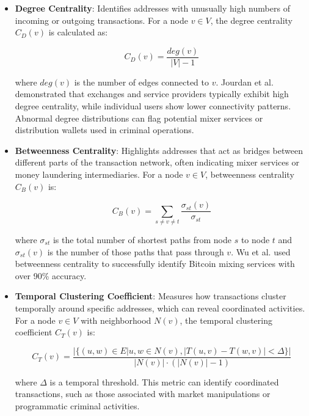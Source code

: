 \documentclass[conference]{IEEEtran}
\begin{document}
\begin{itemize}
    \item \textbf{Degree Centrality}: Identifies addresses with unusually high numbers of incoming or outgoing transactions. For a node $v \in V$, the degree centrality $C_D(v)$ is calculated as:
    
    \begin{equation}
    C_D(v) = \frac{deg(v)}{|V| - 1}
    \end{equation}
    
    where $deg(v)$ is the number of edges connected to $v$. Jourdan et al. \cite{jourdan2018} demonstrated that exchanges and service providers typically exhibit high degree centrality, while individual users show lower connectivity patterns. Abnormal degree distributions can flag potential mixer services or distribution wallets used in criminal operations.
    
    \item \textbf{Betweenness Centrality}: Highlights addresses that act as bridges between different parts of the transaction network, often indicating mixer services or money laundering intermediaries. For a node $v \in V$, betweenness centrality $C_B(v)$ is:
    
    \begin{equation}
    C_B(v) = \sum_{s \neq v \neq t} \frac{\sigma_{st}(v)}{\sigma_{st}}
    \end{equation}
    
    where $\sigma_{st}$ is the total number of shortest paths from node $s$ to node $t$ and $\sigma_{st}(v)$ is the number of those paths that pass through $v$. Wu et al. \cite{wu2021} used betweenness centrality to successfully identify Bitcoin mixing services with over 90\% accuracy.
    
    \item \textbf{Temporal Clustering Coefficient}: Measures how transactions cluster temporally around specific addresses, which can reveal coordinated activities. For a node $v \in V$ with neighborhood $N(v)$, the temporal clustering coefficient $C_T(v)$ is:
    
    \begin{equation}
    C_T(v) = \frac{|\{(u, w) \in E | u, w \in N(v), |T(u, v) - T(w, v)| < \Delta\}|}{|N(v)| \cdot (|N(v)| - 1)}
    \end{equation}
    
    where $\Delta$ is a temporal threshold. This metric can identify coordinated transactions, such as those associated with market manipulations or programmatic criminal activities.
\end{itemize}
\end{document}
